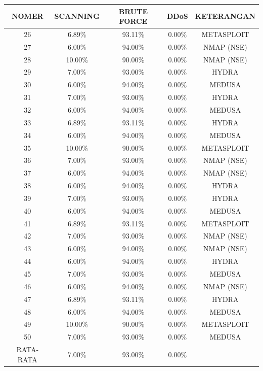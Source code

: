 \begin{table}[H]
	\centering

	\begin{tabular}{|c|c|c|c|c|}
		\hline
		NOMER        & SCANNING & BRUTE FORCE & DDoS   & KETERANGAN \\ \hline
		26        & 6.89\%   & 93.11\%     & 0.00\% & METASPLOIT \\ \hline
		27        & 6.00\%   & 94.00\%     & 0.00\% & NMAP (NSE) \\ \hline
		28        & 10.00\%  & 90.00\%     & 0.00\% & NMAP (NSE) \\ \hline
		29        & 7.00\%   & 93.00\%     & 0.00\% & HYDRA      \\ \hline
		30        & 6.00\%   & 94.00\%     & 0.00\% & MEDUSA     \\ \hline
		31        & 7.00\%   & 93.00\%     & 0.00\% & HYDRA      \\ \hline
		32        & 6.00\%   & 94.00\%     & 0.00\% & MEDUSA     \\ \hline
		33        & 6.89\%   & 93.11\%     & 0.00\% & HYDRA      \\ \hline
		34        & 6.00\%   & 94.00\%     & 0.00\% & MEDUSA     \\ \hline
		35        & 10.00\%  & 90.00\%     & 0.00\% & METASPLOIT \\ \hline
		36        & 7.00\%   & 93.00\%     & 0.00\% & NMAP (NSE) \\ \hline
		37        & 6.00\%   & 94.00\%     & 0.00\% & NMAP (NSE) \\ \hline
		38        & 6.00\%   & 94.00\%     & 0.00\% & HYDRA      \\ \hline
		39        & 7.00\%   & 93.00\%     & 0.00\% & HYDRA      \\ \hline
		40        & 6.00\%   & 94.00\%     & 0.00\% & MEDUSA     \\ \hline
		41        & 6.89\%   & 93.11\%     & 0.00\% & METASPLOIT \\ \hline
		42        & 7.00\%   & 93.00\%     & 0.00\% & NMAP (NSE) \\ \hline
		43        & 6.00\%   & 94.00\%     & 0.00\% & NMAP (NSE) \\ \hline
		44        & 6.00\%   & 94.00\%     & 0.00\% & HYDRA      \\ \hline
		45        & 7.00\%   & 93.00\%     & 0.00\% & MEDUSA     \\ \hline
		46        & 6.00\%   & 94.00\%     & 0.00\% & NMAP (NSE) \\ \hline
		47        & 6.89\%   & 93.11\%     & 0.00\% & HYDRA      \\ \hline
		48        & 6.00\%   & 94.00\%     & 0.00\% & MEDUSA     \\ \hline
		49        & 10.00\%  & 90.00\%     & 0.00\% & METASPLOIT \\ \hline
		50        & 7.00\%   & 93.00\%     & 0.00\% & MEDUSA     \\ \hline
		RATA-RATA & 7.00\%  & 93.00\%      & 0.00\% &            \\ \hline
	\end{tabular}
\end{table}
